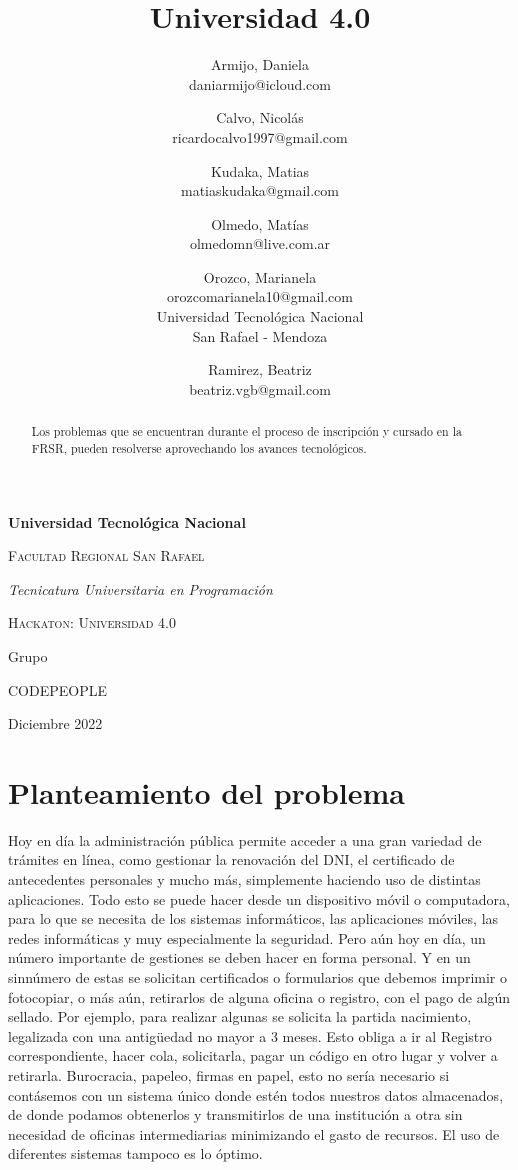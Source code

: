\documentclass[a4paper]{article}
\title{Universidad 4.0}
\author{Armijo, Daniela\\
  \small daniarmijo@icloud.com
  \and
  Calvo, Nicolás\\
  \small ricardocalvo1997@gmail.com
  \and
  Kudaka, Matias\\
  \small matiaskudaka@gmail.com
  \and
  Olmedo, Matías\\
  \small olmedomn@live.com.ar
  \and
  Orozco, Marianela\\
  \small orozcomarianela10@gmail.com\\
  \small Universidad Tecnológica Nacional\\
  \small San Rafael - Mendoza
  \and
  Ramirez, Beatriz\\
  \small beatriz.vgb@gmail.com\\
  \date{}
}
\begin{document}
\begin{titlepage}
\centering
{\bfseries\LARGE Universidad Tecnológica Nacional \par}
\vspace{1cm}
{\scshape\Large Facultad Regional San Rafael\par}
\vspace{3cm}
{\itshape\Large Tecnicatura Universitaria en Programación \par}
\vspace{3cm}
{\scshape\Huge Hackaton: Universidad 4.0 \par}
\vfill
{\Large Grupo \par}
{\Large CODEPEOPLE \par}
\vfill
{\Large Diciembre 2022 \par}
\end{titlepage}

\tableofcontents

\maketitle

\begin{abstract}
Los problemas que se encuentran durante el proceso de inscripción y cursado en la FRSR, pueden resolverse aprovechando los avances tecnológicos.
\end{abstract}

\twocolumn

\section{Planteamiento del problema}

Hoy en día la administración pública permite acceder a una gran variedad de trámites en línea, como gestionar la renovación del DNI, el certificado de antecedentes personales y mucho más, simplemente haciendo uso de distintas aplicaciones. Todo esto se puede hacer desde un dispositivo móvil o computadora, para lo que se necesita de los sistemas informáticos, las aplicaciones móviles, las redes informáticas y muy especialmente la seguridad. Pero aún hoy en día, un número importante de gestiones se deben hacer en forma personal. Y en un sinnúmero de estas se solicitan certificados o formularios que debemos imprimir o fotocopiar, o más aún, retirarlos de alguna oficina o registro, con el pago de algún sellado. Por ejemplo, para realizar algunas se solicita la partida nacimiento, legalizada con una antigüedad no mayor a 3 meses. Esto obliga a ir al Registro correspondiente, hacer cola, solicitarla, pagar un código en otro lugar y volver a retirarla. Burocracia, papeleo, firmas en papel, esto no sería necesario si contásemos con un sistema único donde estén todos nuestros datos almacenados, de donde podamos obtenerlos y transmitirlos de una institución a otra sin necesidad de oficinas intermediarias minimizando el gasto de recursos. El uso de diferentes sistemas tampoco es lo óptimo. 
\end{document}
